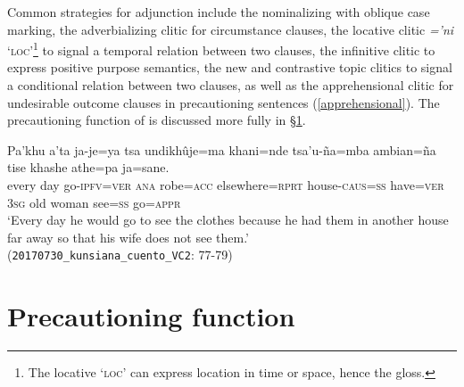 \documentclass[output=paper,colorlinks,citecolor=brown]{langscibook}
\begin{document}
{Common strategies for adjunction include the nominalizing  with oblique case marking, the adverbializing clitic   for circumstance clauses, the locative clitic \emph{='ni} `\textsc{loc}'\footnote{{The locative {\textsc{`loc'}} can express location in time or space, hence the gloss.}} to signal a temporal relation between two clauses, %
the infinitive clitic  to express positive purpose semantics, %
the new  and contrastive  topic clitics to signal a conditional relation between two clauses, %
as well as the apprehensional clitic  for undesirable outcome clauses in precautioning sentences (\ref{apprehensional}).
The precautioning function of  is discussed more fully in \S\ref{sec:precautioningfunction}.}
\begin{exe}
    \ex \label{apprehensional}
    \gll Pa'khu a'ta ja-je=ya       tsa     undikhûje=ma   khani=nde         tsa'u-ña=mba             ambian=ña   {\ob}tise   khashe athe=pa ja=sane.{\cb}\\
         every  day  go-\textsc{ipfv=ver} \textsc{ana} robe=\textsc{acc} elsewhere=\textsc{rprt} house-\textsc{caus=ss} have=\textsc{ver} \textsc{3sg} {old woman} see=\textsc{ss} go=\textsc{appr} \\
    \glt  `Every day he would go to see the clothes because he had them in another house far away so that his wife does not see them.'
    \\ \hfill (\texttt{20170730\_kunsiana\_cuento\_VC2}: {\textsc{77-79}})
\end{exe}
  



\section{Precautioning function} \label{sec:precautioningfunction}
\end{document}
